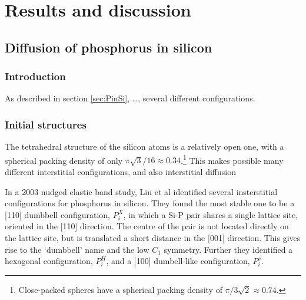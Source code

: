 \documentclass[11pt,bibliography=totoc,index=totoc]{scrbook}   %
\begin{document}




\part{Results and discussion}

\chapter{Diffusion of phosphorus in silicon}

\section{Introduction}\label{sec:resultsIntro}

As described in section \ref{sec:PinSi}, \ldots, several different configurations.


\section{Initial structures}\label{sec:structures}

The tetrahedral structure of the silicon atoms is a relatively open one, with a spherical packing density of only $\pi\sqrt{3}/16\approx 0.34$.\footnote{Close-packed spheres have a spherical packing density of $\pi/3\sqrt{2} \approx 0.74$.}
This makes possible many different interstitial configurations, and also interstitial diffusion







In a 2003 nudged elastic band study, Liu et al identified several insterstitial configurations for phosphorus in silicon.
They found the most stable one to be a [110] dumbbell configuration, $P_i^X$, in which a Si-P pair shares a single lattice site, oriented in the [110] direction. The centre of the pair is not located directly on the lattice site, but is translated a short distance in the [001] direction. This gives rise to the `dumbbell' name and the low $C_1$ symmetry.
Further they identified a hexagonal configuration, $P_i^H$, and a [100] dumbell-like configuration, $P_i^s$.

\end{document}
